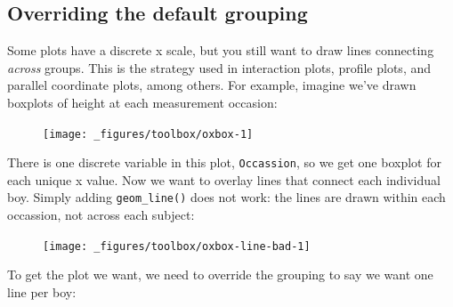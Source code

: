 \subsection{Overriding the default grouping}

Some plots have a discrete x scale, but you still want to draw lines
connecting \emph{across} groups. This is the strategy used in
interaction plots, profile plots, and parallel coordinate plots, among
others. For example, imagine we've drawn boxplots of height at each
measurement occasion: 

\begin{Shaded}
\begin{Highlighting}[]
\StringTok{ }
\StringTok{  }\NormalTok{()}
\end{Highlighting}
\end{Shaded}

\begin{figure}[H]
  \centering
  \texttt{[image: \_figures/toolbox/oxbox-1]}
\end{figure}

There is one discrete variable in this plot, \texttt{Occassion}, so we
get one boxplot for each unique x value. Now we want to overlay lines
that connect each individual boy. Simply adding \texttt{geom\_line()}
does not work: the lines are drawn within each occassion, not across
each subject:

\begin{Shaded}
\begin{Highlighting}[]
\StringTok{ }
\StringTok{  }\NormalTok{() +}
\StringTok{  }\NormalTok{(} \NormalTok{, } \NormalTok{)}
\end{Highlighting}
\end{Shaded}

\begin{figure}[H]
  \centering
  \texttt{[image: \_figures/toolbox/oxbox-line-bad-1]}
\end{figure}

To get the plot we want, we need to override the grouping to say we want
one line per boy:

\begin{Shaded}
\begin{Highlighting}[]
\StringTok{ }
\StringTok{  }\NormalTok{() +}
\StringTok{  }\NormalTok{(}\NormalTok{(}  \NormalTok{, } \NormalTok{)}
\end{Highlighting}
\end{Shaded}

